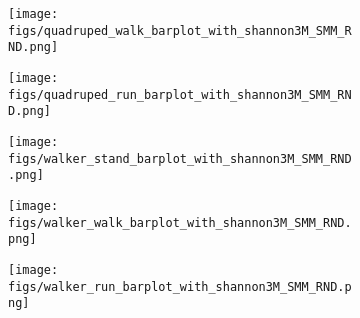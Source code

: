 \begin{figure}[!htp]
    \begin{subfigure}{.95\textwidth}
    \texttt{[image: figs/quadruped\_walk\_barplot\_with\_shannon3M\_SMM\_RND.png]}
    \label{fig:orl:quad_walk}
    \end{subfigure}
    \vspace{-4mm}
    \begin{subfigure}{.95\textwidth}
    \texttt{[image: figs/quadruped\_run\_barplot\_with\_shannon3M\_SMM\_RND.png]}
    \label{fig:orl:quad_run}
    \end{subfigure}
    \vspace{-4mm}
    \begin{subfigure}{.95\textwidth}
    \texttt{[image: figs/walker\_stand\_barplot\_with\_shannon3M\_SMM\_RND.png]}
    \label{fig:orl:walker_stand}
    \end{subfigure}
    \vspace{-4mm}
    \begin{subfigure}{.95\textwidth}
    \texttt{[image: figs/walker\_walk\_barplot\_with\_shannon3M\_SMM\_RND.png]}
    \label{fig:orl:walker_walk}
    \end{subfigure}
    \vspace{-4mm}
    \begin{subfigure}{.95\textwidth}
    \texttt{[image: figs/walker\_run\_barplot\_with\_shannon3M\_SMM\_RND.png]}
    \label{fig:orl:walker_run}
    \end{subfigure}
    \vspace{-4mm}
    \caption{\small {} }
    \label{fig:orl_performance}
\end{figure} 




